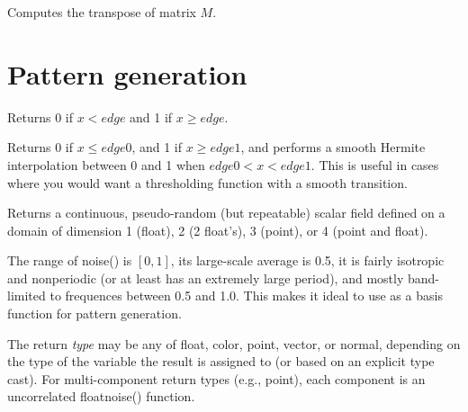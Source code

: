 \documentclass[11pt,letterpaper]{book}
\def\color{{\cf color}\xspace}
\def\float{{\cf float}\xspace}
\def\normal{{\cf normal}\xspace}
\def\point{{\cf point}\xspace}
\def\vector{{\cf vector}\xspace}
\def\noise{{\cf noise()}\xspace}
\begin{document}
Computes the transpose of matrix $M$.
\apiend

\section{Pattern generation}
\label{sec:stdlib:pattern}

Returns 0 if $x < {\mathit edge}$ and 1 if $x \ge {\mathit edge}$.
\apiend

Returns 0 if $x \le {\mathit edge0}$, and 1 if $x \ge {\mathit edge1}$,
and performs a smooth Hermite
interpolation between 0 and 1 when ${\mathit edge0} < x < {\mathit edge1}$.
This is useful in cases where you would want a thresholding function
with a smooth transition.
\apiend

%


Returns a continuous, pseudo-random (but repeatable) scalar field
defined on a domain of dimension 1 (\float), 2 (2 \float's), 3 (\point),
or 4 (\point and \float).

The range of \noise is $[0,1]$, its large-scale average is 0.5, it is 
fairly isotropic and nonperiodic (or at least has an extremely large
period), and mostly band-limited to frequences between 0.5 and 1.0.
This makes it ideal to use as a basis function for pattern generation.

The return \emph{type} may be any of \float, \color, \point, \vector, or
\normal, depending on the type of the variable the result is assigned to
(or based on an explicit type cast).  For multi-component return types
(e.g., \point), each component is an uncorrelated \float \noise
function.
\apiend
\end{document}
